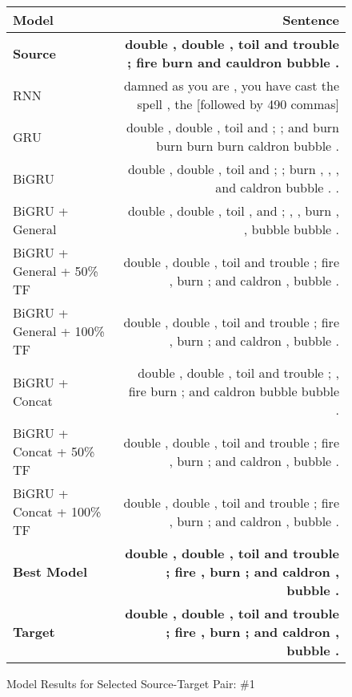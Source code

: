 \documentclass[twoside,twocolumn]{article}
\newlength\mystoreparindent
\newenvironment{myparindent}[1]{%
  \setlength{\mystoreparindent}{\the\parindent}
  \setlength{\parindent}{#1}
  }{%
  \setlength{\parindent}{\mystoreparindent}
}
\begin{document}
\begin{myparindent}{0pt}
\begin{figure}[ht!]
    \centering
    \begin{tabular}{ |l|r| }
        \hline
        \textbf{Model}
          & \textbf{Sentence} \\
        \hline
        \textbf{Source} & \textbf{double , double , toil and trouble ; fire burn and cauldron bubble .} \\ \hline
        RNN & damned as you are , you have cast the spell , the [followed by 490 commas] \\ \hline
        GRU & double , double , toil and ; ; and burn burn burn burn caldron bubble . \\ \hline
        BiGRU & double , double , toil and ; ; burn , , , and caldron bubble . . \\ \hline
        BiGRU + General & double , double , toil , and ; , , burn , , bubble bubble . \\ \hline
        BiGRU + General + 50\% TF & double , double , toil and trouble ; fire , burn ; and caldron , bubble . \\ \hline
        BiGRU + General + 100\% TF & double , double , toil and trouble ; fire , burn ; and caldron , bubble . \\ \hline
        BiGRU + Concat & double , double , toil and trouble ; , fire burn ; and caldron bubble bubble . \\ \hline
        BiGRU + Concat + 50\% TF & double , double , toil and trouble ; fire , burn ; and caldron , bubble . \\ \hline
        BiGRU + Concat + 100\% TF & double , double , toil and trouble ; fire , burn ; and caldron , bubble . \\ \hline
        \textbf{Best Model} & \textbf{double , double , toil and trouble ; fire , burn ; and caldron , bubble .} \\ \hline
        \textbf{Target} & \textbf{double , double , toil and trouble ; fire , burn ; and caldron , bubble .} \\ \hline
    \end{tabular}
    \caption{Model Results for Selected Source-Target Pair: \#1}
    \label{fig:model-results-1}
\end{figure}


\end{myparindent}
\end{document}
